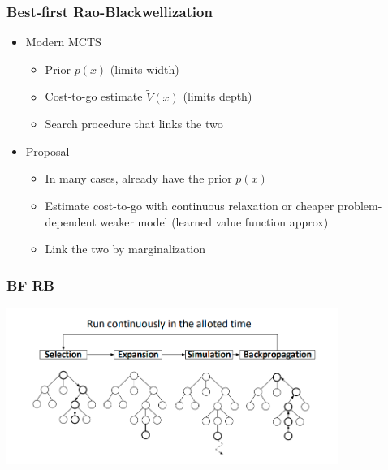\documentclass{beamer}
\begin{document}
\begin{frame}
\frametitle{Best-first Rao-Blackwellization}
\begin{itemize}
\item Modern MCTS
    \begin{itemize}
    \item Prior $p(x)$ (limits width)
    \item Cost-to-go estimate $\tilde{V}(x)$ (limits depth)
    \item Search procedure that links the two
    \end{itemize}
\item Proposal
    \begin{itemize}
    \item In many cases, already have the prior $p(x)$
    \item Estimate cost-to-go with continuous relaxation or cheaper problem-dependent
        weaker model (learned value function approx)
    \item Link the two by marginalization
    \end{itemize}
\end{itemize}
\end{frame}

\begin{frame}
\frametitle{BF RB}
\includegraphics[height=2in]{img/mcts.png}
\end{frame}
\end{document}

